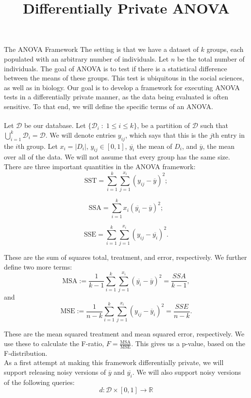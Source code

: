 \documentclass[11pt]{article}
\begin{document}
\title{Differentially Private ANOVA}

\maketitle


\begin{section}{The ANOVA Framework}
The setting is that we have a dataset of $k$ groups, each populated with 
an arbitrary number of individuals. Let $n$ be the total number of 
individuals.
The goal of ANOVA is to test if there 
is a statistical difference between the means of these groups. This test 
is ubiquitous in the social sciences, as well as in biology. Our goal is to 
develop a framework for executing ANOVA tests in a differentially 
private manner, as the data being evaluated is often sensitive. To that 
end, we will define the specific terms of an ANOVA.
\\
\\
Let $\mathcal{D}$ be our database. Let $\{\mathcal{D}_i\; : \; 1\leq i\leq 
k\}$, be a partition of $\mathcal{D}$ such that 
$\bigcup_{i=1}^k \mathcal{D}_i = \mathcal{D}$. We will denote entries 
$y_{ij}$, which says that this is the $j$th entry in the $i$th group. Let 
$x_i = |D_i|$, $y_{ij}\in [0,1]$, $\overline{y_i}$ the mean of $D_i$, and 
$\overline{y}$, the mean over all of the data. We will 
not assume that every group has the same size. There are three important 
quantities in the ANOVA framework:
\[
\text{SST} = \sum_{i=1}^k \sum_{j=1}^{x_i} (y_{ij} - \overline{y})^2;
\]

\[
\text{SSA} = \sum_{i=1}^{k} x_i(\overline{y_i} - \overline{y})^2;
\]

\[
\text{SSE} = \sum_{i=1}^k \sum_{j=1}^{x_i} (y_{ij} - \overline{y_i})^2.
\]

These are the sum of squares total, treatment, and error, respectively. 
We further define two more terms: 
\[
\text{MSA} := \frac{1}{k-1}\sum_{i=1}^{k} 
\sum_{j=1}^{x_i}(\overline{y_i} - \overline{y})^2 = \frac{SSA}{k-1},
\] 
and 
\[
\text{MSE} := \frac{1}{n-k} \sum_{i=1}^k \sum_{j=1}^{x_i} (y_{ij} - 
\overline{y}_i)^2 = \frac{SSE}{n-k}.
\]

These are the mean squared treatment and mean squared error, respectively. 
We use these to calculate the F-ratio, $F=\frac{\text{MSA}}{\text{MSE}}$. 
This gives us a p-value, based on the F-distribution.
\\
As a first attempt at making this framework differentially private, we will 
support releasing noisy versions of $\overline{y}$ and $\overline{y_i}$. We 
will also support noisy versions of the following queries:
\[
d:\mathcal{D}\times [0,1]\to\mathbb{R}
\]


\end{section}
\end{document}
